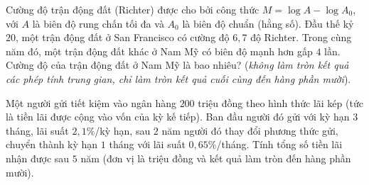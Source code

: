 \begin{ex}%
	Cường độ trận động đất (Richter) được cho bởi công thức $M = \log A - \log A_0$, với $A$ là biên độ rung chấn tối đa và $A_0$ là biên độ chuẩn (hằng số). Đầu thế kỷ $20$, một trận động đất ở San Francisco có cường độ $6{,}7$ độ Richter. Trong cùng năm đó, một trận động đất khác ở Nam Mỹ có biên độ mạnh hơn gấp $4$ lần. Cường độ của trận động đất ở Nam Mỹ là bao nhiêu? (\textit{không làm tròn kết quả các phép tính trung gian, chỉ làm tròn kết quả cuối cùng đến hàng phần mười}).
	\par{}
\end{ex}

\begin{ex}%
Một người gửi tiết kiệm vào ngân hàng $200$ triệu đồng theo hình thức lãi kép (tức là tiền lãi được cộng vào vốn của kỳ kế tiếp). Ban đầu người đó gửi với kỳ hạn $3$ tháng, lãi suất $2{,}1 \%$/kỳ hạn, sau $2$ năm người đó thay đổi phương thức gửi, chuyển thành kỳ hạn $1$ tháng với lãi suất $0{,}65 \%$/tháng. Tính tổng số tiền lãi nhận được sau $5$ năm (đơn vị là triệu đồng và kết quả làm tròn đến hàng phần mười).
\end{ex}

